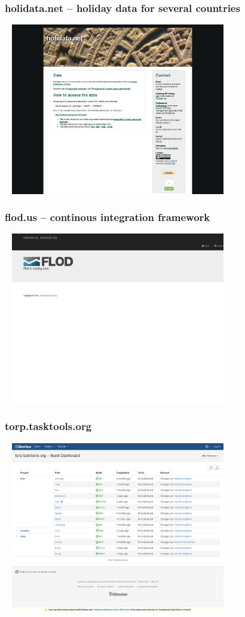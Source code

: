 \documentclass[t]{beamer}
\begin{document}
\begin{frame}\frametitle{holidata.net -- holiday data for several countries}
    \begin{center}
        \href{http://holidata.net/}{\includegraphics[width=10cm,height=7.5cm]{holidata-net.png}}
    \end{center}
\end{frame}

\begin{frame}\frametitle{flod.us -- continous integration framework}
    \begin{center}
        \href{http://flod.us/}{\includegraphics[width=10cm,height=7.5cm]{flod-us.png}}
    \end{center}
\end{frame}

\begin{frame}\frametitle{torp.tasktools.org}
    \begin{center}
        \href{https://torp.tasktools.org}{\includegraphics[width=10cm,height=7.5cm]{torp-tasktools-org.png}}
    \end{center}
\end{frame}
\end{document}
